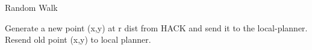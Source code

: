 \begin{algorithm}
	\caption{Random Walk} \label{algo:RndWalk}
	
    \small
	\begin{algorithmic}[1]
				\State Generate a new point ({x,y}) at r dist from HACK and send it to the local-planner.
			\Else
			    \State Resend old point (x,y) to local planner.
			\EndIf
		\EndIf
	\end{algorithmic} 
\end{algorithm}